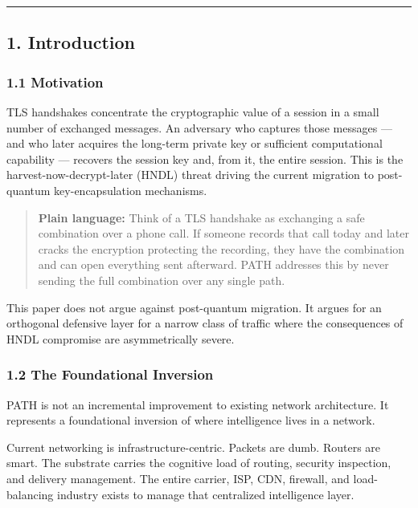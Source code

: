 \documentclass[
  11pt,
]{article}
\begin{document}
\begin{center}\rule{0.5\linewidth}{0.5pt}\end{center}

\hypertarget{introduction}{%
\subsection{1. Introduction}\label{introduction}}

\hypertarget{motivation}{%
\subsubsection{1.1 Motivation}\label{motivation}}

TLS handshakes concentrate the cryptographic value of a session in a
small number of exchanged messages. An adversary who captures those
messages --- and who later acquires the long-term private key or
sufficient computational capability --- recovers the session key and,
from it, the entire session. This is the harvest-now-decrypt-later
(HNDL) threat driving the current migration to post-quantum
key-encapsulation mechanisms.

\begin{quote}
\textbf{Plain language:} Think of a TLS handshake as exchanging a safe
combination over a phone call. If someone records that call today and
later cracks the encryption protecting the recording, they have the
combination and can open everything sent afterward. PATH addresses this
by never sending the full combination over any single path.
\end{quote}

This paper does not argue against post-quantum migration. It argues for
an orthogonal defensive layer for a narrow class of traffic where the
consequences of HNDL compromise are asymmetrically severe.

\hypertarget{the-foundational-inversion}{%
\subsubsection{1.2 The Foundational
Inversion}\label{the-foundational-inversion}}

PATH is not an incremental improvement to existing network architecture.
It represents a foundational inversion of where intelligence lives in a
network.

Current networking is infrastructure-centric. Packets are dumb. Routers
are smart. The substrate carries the cognitive load of routing, security
inspection, and delivery management. The entire carrier, ISP, CDN,
firewall, and load-balancing industry exists to manage that centralized
intelligence layer.
\end{document}
